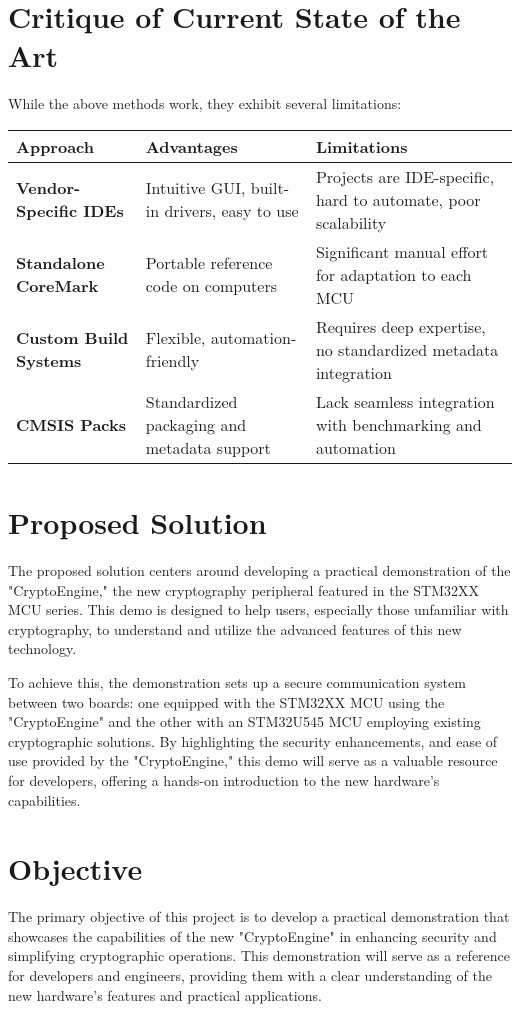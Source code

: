 \section{Critique of Current State of the Art}

While the above methods work, they exhibit several limitations:


\begin{tabularx}{\linewidth}{@{}>{\bfseries}l X X@{}}
	\toprule
	Approach & Advantages & Limitations \\
	\midrule
	Vendor-Specific IDEs & Intuitive GUI, built-in drivers, easy to use & Projects are IDE-specific, hard to automate, poor scalability \\
	\midrule
	Standalone CoreMark & Portable reference code on computers & Significant manual effort for adaptation to each MCU \\
	\midrule
	Custom Build Systems & Flexible, automation-friendly & Requires deep expertise, no standardized metadata integration \\
	\midrule
	CMSIS Packs & Standardized packaging and metadata support & Lack seamless integration with benchmarking and automation \\
	\bottomrule
\end{tabularx}

\section{Proposed Solution}

The proposed solution centers around developing a practical demonstration of the "CryptoEngine," the new cryptography peripheral featured in the STM32XX MCU series. This demo is designed to help users, especially those unfamiliar with cryptography, to understand and utilize the advanced features of this new technology.

To achieve this, the demonstration sets up a secure communication system between two boards: one equipped with the STM32XX MCU using the "CryptoEngine" and the other with an STM32U545 MCU employing existing cryptographic solutions. By highlighting the security enhancements, and ease of use provided by the "CryptoEngine," this demo will serve as a valuable resource for developers, offering a hands-on introduction to the new hardware's capabilities.

\section{Objective}
The primary objective of this project is to develop a practical demonstration that showcases the capabilities of the new "CryptoEngine" in enhancing security and simplifying cryptographic operations. This demonstration will serve as a reference for developers and engineers, providing them with a clear understanding of the new hardware's features and practical applications.

